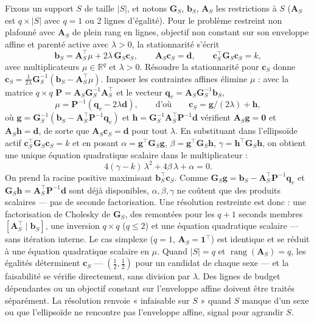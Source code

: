 \documentclass[11pt]{article}
\newcommand{\tp}{^{\top}}
\newcommand{\bc}{\mathbf{c}}
\newcommand{\bb}{\mathbf{b}}
\newcommand{\bG}{\mathbf{G}}
\newcommand{\bA}{\mathbf{A}}
\newcommand{\bd}{\mathbf{d}}
\begin{document}
Fixons un support $S$ de taille $|S|$, et notons $\bG_S$, $\bb_S$, $\bA_S$ les restrictions à $S$ ($\bA_S$ est $q\times|S|$ avec $q=1$ ou 2 lignes d'égalité). Pour le problème restreint non plafonné avec $\bA_S$ de plein rang en lignes, objectif non constant sur son enveloppe affine et parenté active avec $\lambda>0$, la stationnarité s'écrit
\[
  \bb_S = \bA_S\tp\mu + 2\lambda\,\bG_S\bc_S,\qquad \bA_S\bc_S=\bd,\qquad \bc_S\tp\bG_S\bc_S=k,
\]
avec multiplicateurs $\mu\in\mathbb{R}^q$ et $\lambda>0$. Résoudre la stationnarité pour $\bc_S$ donne $\bc_S=\tfrac{1}{2\lambda}\bG_S^{-1}(\bb_S-\bA_S\tp\mu)$. Imposer les contraintes affines élimine $\mu$ : avec la matrice $q\times q$ $\mathbf{P}=\bA_S\bG_S^{-1}\bA_S\tp$ et le vecteur $\mathbf{q}_v=\bA_S\bG_S^{-1}\bb_S$,
\[
  \mu=\mathbf{P}^{-1}(\mathbf{q}_v-2\lambda\bd),\qquad\text{d'où}\qquad \bc_S=\mathbf{g}/(2\lambda)+\mathbf{h},
\]
où $\mathbf{g}=\bG_S^{-1}(\bb_S-\bA_S\tp\mathbf{P}^{-1}\mathbf{q}_v)$ et $\mathbf{h}=\bG_S^{-1}\bA_S\tp\mathbf{P}^{-1}\bd$ vérifient $\bA_S\mathbf{g}=\mathbf{0}$ et $\bA_S\mathbf{h}=\bd$, de sorte que $\bA_S\bc_S=\bd$ pour tout $\lambda$. En substituant dans l'ellipsoïde actif $\bc_S\tp\bG_S\bc_S=k$ et en posant $\alpha=\mathbf{g}\tp\bG_S\mathbf{g}$, $\beta=\mathbf{g}\tp\bG_S\mathbf{h}$, $\gamma=\mathbf{h}\tp\bG_S\mathbf{h}$, on obtient une unique équation quadratique scalaire dans le multiplicateur :
\[
  4(\gamma-k)\,\lambda^2 + 4\beta\,\lambda + \alpha = 0.
\]
On prend la racine positive maximisant $\bb_S\tp\bc_S$. Comme $\bG_S\mathbf{g}=\bb_S-\bA_S\tp\mathbf{P}^{-1}\mathbf{q}_v$ et $\bG_S\mathbf{h}=\bA_S\tp\mathbf{P}^{-1}\bd$ sont déjà disponibles, $\alpha,\beta,\gamma$ ne coûtent que des produits scalaires --- pas de seconde factorisation. Une résolution restreinte est donc : une factorisation de Cholesky de $\bG_S$, des remontées pour les $q+1$ seconds membres $[\bA_S\tp\mid\bb_S]$, une inversion $q\times q$ ($q\le2$) et une équation quadratique scalaire --- sans itération interne. Le cas simplexe ($q=1$, $\bA_S=\mathbf{1}\tp$) est identique et se réduit à une équation quadratique scalaire en $\mu$. Quand $|S|=q$ et $\operatorname{rang}(\bA_S)=q$, les égalités déterminent $\bc_S$ --- $(\tfrac12,\tfrac12)$ pour un candidat de chaque sexe --- et la faisabilité se vérifie directement, sans division par $\lambda$. Des lignes de budget dépendantes ou un objectif constant sur l'enveloppe affine doivent être traités séparément. La résolution renvoie « infaisable sur $S$ » quand $S$ manque d'un sexe ou que l'ellipsoïde ne rencontre pas l'enveloppe affine, signal pour agrandir $S$.
\end{document}
